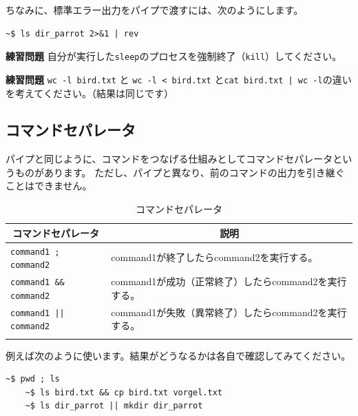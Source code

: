 \documentclass[a4j]{ltjreport}
\begin{document}
    ちなみに、標準エラー出力をパイプで渡すには、次のようにします。
    \begin{lstlisting}[numbers=none]
    ~$ ls dir_parrot 2>&1 | rev
    \end{lstlisting}

    \begin{itembox}[l]{\textbf{練習問題}}
        自分が実行した\texttt{sleep}のプロセスを強制終了（\texttt{kill}）してください。
    \end{itembox}

    \begin{itembox}[l]{\textbf{練習問題}}
        \texttt{wc -l bird.txt} と \texttt{wc -l < bird.txt} と\texttt{cat bird.txt | wc -l}の違いを考えてください。（結果は同じです）
    \end{itembox}

    \subsection{コマンドセパレータ}
    パイプと同じように、コマンドをつなげる仕組みとしてコマンドセパレータというものがあります。
    ただし、パイプと異なり、前のコマンドの出力を引き継ぐことはできません。
    \begin{longtable}[c]{|l|l|}
        \hline
        \multicolumn{1}{|c|}{\textbf{コマンドセパレータ}}&\multicolumn{1}{|c|}{\textbf{説明}}\\
        \hline\hline
        \texttt{command1 ; command2} &command1が終了したらcommand2を実行する。\\
        \hline
        \texttt{command1 \&\& command2} &command1が成功（正常終了）したらcommand2を実行する。\\
        \hline
        \texttt{command1 || command2} &command1が失敗（異常終了）したらcommand2を実行する。\\
        \hline
        \caption{コマンドセパレータ}
    \end{longtable}

    例えば次のように使います。結果がどうなるかは各自で確認してみてください。
    \begin{lstlisting}[numbers=none]
    ~$ pwd ; ls
    ~$ ls bird.txt && cp bird.txt vorgel.txt
    ~$ ls dir_parrot || mkdir dir_parrot
    \end{lstlisting}
\end{document}
